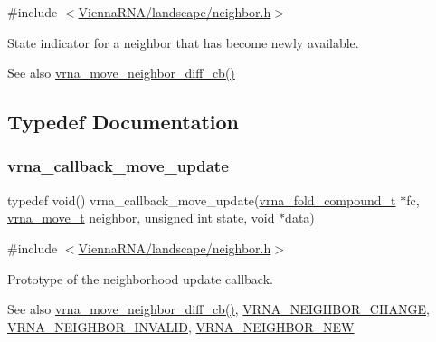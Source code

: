 {\ttfamily \#include $<$\mbox{\hyperlink{landscape_2neighbor_8h}{Vienna\+R\+N\+A/landscape/neighbor.\+h}}$>$}



State indicator for a neighbor that has become newly available. 

\begin{DoxySeeAlso}{See also}
\mbox{\hyperlink{group__neighbors_gad495362605ffd0168591ce41a685ee3e}{vrna\+\_\+move\+\_\+neighbor\+\_\+diff\+\_\+cb()}} 
\end{DoxySeeAlso}


\subsection{Typedef Documentation}
\mbox{\label{group__neighbors_ga4605019694e3d38e2c40d5a97ef99920}} 
\subsubsection{\texorpdfstring{vrna\_callback\_move\_update}{vrna\_callback\_move\_update}}
{\footnotesize\ttfamily typedef void() vrna\+\_\+callback\+\_\+move\+\_\+update(\mbox{\hyperlink{group__fold__compound_ga1b0cef17fd40466cef5968eaeeff6166}{vrna\+\_\+fold\+\_\+compound\+\_\+t}} $\ast$fc, \mbox{\hyperlink{group__neighbors_ga08630e00206cd163ea29c462bf5f4755}{vrna\+\_\+move\+\_\+t}} neighbor, unsigned int state, void $\ast$data)}



{\ttfamily \#include $<$\mbox{\hyperlink{landscape_2neighbor_8h}{Vienna\+R\+N\+A/landscape/neighbor.\+h}}$>$}



Prototype of the neighborhood update callback. 

\begin{DoxySeeAlso}{See also}
\mbox{\hyperlink{group__neighbors_gad495362605ffd0168591ce41a685ee3e}{vrna\+\_\+move\+\_\+neighbor\+\_\+diff\+\_\+cb()}}, \mbox{\hyperlink{group__neighbors_gae72b0e349b6108c00737df51cce44622}{V\+R\+N\+A\+\_\+\+N\+E\+I\+G\+H\+B\+O\+R\+\_\+\+C\+H\+A\+N\+GE}}, \mbox{\hyperlink{group__neighbors_gaf7e3417828057ae0ed4d0de03178116a}{V\+R\+N\+A\+\_\+\+N\+E\+I\+G\+H\+B\+O\+R\+\_\+\+I\+N\+V\+A\+L\+ID}}, \mbox{\hyperlink{group__neighbors_ga9343dd62daad15b6b8c55c1260c09228}{V\+R\+N\+A\+\_\+\+N\+E\+I\+G\+H\+B\+O\+R\+\_\+\+N\+EW}}
\end{DoxySeeAlso}

